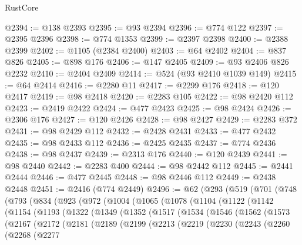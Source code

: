 \begin{lexlean}{RustCore}
\begin{coremodule}
@2394 := @138 @2393
@2395 := @93 @2394
@2396 := @774 @122
@2397 := @2395 @2396
@2398 := @774 @1353
@2399 := @2397 @2398
@2400 := @2388 @2399
@2402 := @1105 (@2384 @2400)
@2403 := @64 @2402
@2404 := @837 @826
@2405 := @898 @176
@2406 := @147 @2405
@2409 := @93 @2406 @826 @2232
@2410 := @2404 @2409
@2414 := @524 (@93 @2410 @1039 @149)
@2415 := @64 @2414
@2416 := @2280 @11
@2417 := @2299 @176
@2418 := @120 @2417
@2419 := @98 @2418
@2420 := @2283 @105
@2422 := @98 @2420 @112
@2423 := @2419 @2422
@2424 := @477 @2423
@2425 := @98 @2424
@2426 := @2306 @176
@2427 := @120 @2426
@2428 := @98 @2427
@2429 := @2283 @372
@2431 := @98 @2429 @112
@2432 := @2428 @2431
@2433 := @477 @2432
@2435 := @98 @2433 @112
@2436 := @2425 @2435
@2437 := @774 @2436
@2438 := @98 @2437
@2439 := @2313 @176
@2440 := @120 @2439
@2441 := @98 @2440
@2442 := @2283 @400
@2444 := @98 @2442 @112
@2445 := @2441 @2444
@2446 := @477 @2445
@2448 := @98 @2446 @112
@2449 := @2438 @2448
@2451 := @2416 (@774 @2449)
@2496 := @62
    (@293
      (@519
        (@701
          (@748
            (@793
              (@834
                (@923
                  (@972
                    (@1004
                      (@1065
                        (@1078
                          (@1104
                            (@1122
                              (@1142
                                (@1154
                                  (@1193
                                    (@1322
                                      (@1349
                                        (@1352
                                          (@1517
                                            (@1534
                                              (@1546
                                                (@1562
                                                  (@1573
                                                    (@2167
                                                      (@2172
                                                        (@2181
                                                          (@2189
                                                            (@2199
                                                              (@2213
                                                                (@2219
                                                                  (@2230
                                                                    (@2243
                                                                      (@2260
                                                                        (@2268
                                                                          (@2277

\end{coremodule}
\end{lexlean}
